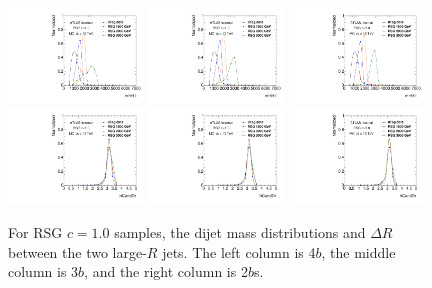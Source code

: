 \begin{figure}[htbp!]
\begin{center}
\includegraphics[width=0.32\textwidth,angle=-90]{figures/boosted/Truth/Moriond_comp_0_FourTag_Signal_mHH_l.pdf}
\includegraphics[width=0.32\textwidth,angle=-90]{figures/boosted/Truth/Moriond_comp_0_ThreeTag_Signal_mHH_l.pdf}
\includegraphics[width=0.32\textwidth,angle=-90]{figures/boosted/Truth/Moriond_comp_0_TwoTag_split_Signal_mHH_l.pdf}\\
\includegraphics[width=0.32\textwidth,angle=-90]{figures/boosted/Truth/Moriond_comp_0_FourTag_Signal_hCandDr.pdf}
\includegraphics[width=0.32\textwidth,angle=-90]{figures/boosted/Truth/Moriond_comp_0_ThreeTag_Signal_hCandDr.pdf}
\includegraphics[width=0.32\textwidth,angle=-90]{figures/boosted/Truth/Moriond_comp_0_TwoTag_split_Signal_hCandDr.pdf}\\
\caption{For RSG $c=1.0$ samples, the dijet mass distributions and $\Delta R$ between the two large-$R$ jets. The left column is 4$b$, the middle column is 3$b$, and the right column is 2$b$s.}
\label{fig:app-signal-jj}
\end{center}
\end{figure}


